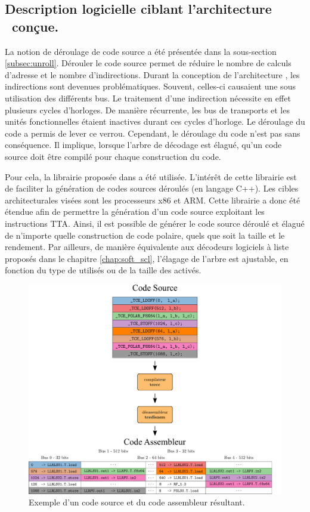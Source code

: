\subsection{Description logicielle ciblant l'architecture \TTSC~conçue.}

La notion de déroulage de code source a été présentée dans la sous-section \ref{subsec:unroll}. Dérouler le code source permet de réduire le nombre de calculs d'adresse et le nombre d'indirections. Durant la conception de l'architecture \TTSC, les indirections sont devenues problématiques. Souvent, celles-ci causaient une sous utilisation des différents bus. Le traitement d'une indirection nécessite en effet plusieurs cycles d'horloges. De manière récurrente, les bus de transports et les unités fonctionnelles étaient inactives durant ces cycles d'horloge. Le déroulage du code a permis de lever ce verrou. Cependant, le déroulage du code n'est pas sans conséquence. Il implique, lorsque l'arbre de décodage est élagué, qu'un code source doit être compilé pour chaque construction du code.

Pour cela, la librairie proposée dans \cite{cassagne_efficient_2015} a été utilisée. L'intérêt de cette librairie est de faciliter la génération de codes sources déroulés (en langage C++). Les cibles architecturales visées sont les processeurs x86 et ARM. Cette librairie a donc été étendue afin de permettre la génération d'un code source exploitant les instructions TTA. Ainsi, il est possible de générer le code source déroulé et élagué de n'importe quelle construction de code polaire, quels que soit la taille et le rendement. Par ailleurs, de manière équivalente aux décodeurs logiciels à liste proposés dans le chapitre \ref{chap:soft_scl}, l'élagage de l'arbre est ajustable, en fonction du type de \noeuds utilisés ou de la taille des \noeuds activés.


\begin{figure}[t]
\centering
\includegraphics[width=\textwidth]{main/ch4_fig/ilp_1}
\caption{Exemple d'un code source et du code assembleur résultant.}
\label{fig:ilp_1}
\end{figure}


